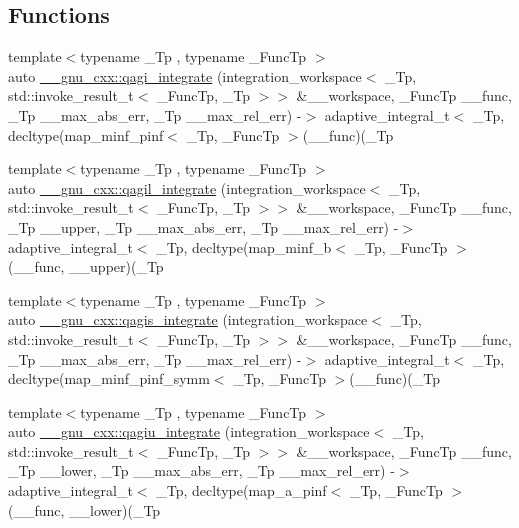\subsection*{Functions}
\begin{DoxyCompactItemize}
\item 
{\footnotesize template$<$typename \+\_\+\+Tp , typename \+\_\+\+Func\+Tp $>$ }\\auto \hyperlink{namespace____gnu__cxx_a0425e6f64911ad03088ec405d47f6817}{\+\_\+\+\_\+gnu\+\_\+cxx\+::qagi\+\_\+integrate} (integration\+\_\+workspace$<$ \+\_\+\+Tp, std\+::invoke\+\_\+result\+\_\+t$<$ \+\_\+\+Func\+Tp, \+\_\+\+Tp $>$$>$ \&\+\_\+\+\_\+workspace, \+\_\+\+Func\+Tp \+\_\+\+\_\+func, \+\_\+\+Tp \+\_\+\+\_\+max\+\_\+abs\+\_\+err, \+\_\+\+Tp \+\_\+\+\_\+max\+\_\+rel\+\_\+err) -\/$>$ adaptive\+\_\+integral\+\_\+t$<$ \+\_\+\+Tp, decltype(map\+\_\+minf\+\_\+pinf$<$ \+\_\+\+Tp, \+\_\+\+Func\+Tp $>$(\+\_\+\+\_\+func)(\+\_\+\+Tp
\item 
{\footnotesize template$<$typename \+\_\+\+Tp , typename \+\_\+\+Func\+Tp $>$ }\\auto \hyperlink{namespace____gnu__cxx_a1bc1539a9c0330930a7e37da72bc3d45}{\+\_\+\+\_\+gnu\+\_\+cxx\+::qagil\+\_\+integrate} (integration\+\_\+workspace$<$ \+\_\+\+Tp, std\+::invoke\+\_\+result\+\_\+t$<$ \+\_\+\+Func\+Tp, \+\_\+\+Tp $>$$>$ \&\+\_\+\+\_\+workspace, \+\_\+\+Func\+Tp \+\_\+\+\_\+func, \+\_\+\+Tp \+\_\+\+\_\+upper, \+\_\+\+Tp \+\_\+\+\_\+max\+\_\+abs\+\_\+err, \+\_\+\+Tp \+\_\+\+\_\+max\+\_\+rel\+\_\+err) -\/$>$ adaptive\+\_\+integral\+\_\+t$<$ \+\_\+\+Tp, decltype(map\+\_\+minf\+\_\+b$<$ \+\_\+\+Tp, \+\_\+\+Func\+Tp $>$(\+\_\+\+\_\+func, \+\_\+\+\_\+upper)(\+\_\+\+Tp
\item 
{\footnotesize template$<$typename \+\_\+\+Tp , typename \+\_\+\+Func\+Tp $>$ }\\auto \hyperlink{namespace____gnu__cxx_a7c2c57e5fc096155130cb44c4dacdd23}{\+\_\+\+\_\+gnu\+\_\+cxx\+::qagis\+\_\+integrate} (integration\+\_\+workspace$<$ \+\_\+\+Tp, std\+::invoke\+\_\+result\+\_\+t$<$ \+\_\+\+Func\+Tp, \+\_\+\+Tp $>$$>$ \&\+\_\+\+\_\+workspace, \+\_\+\+Func\+Tp \+\_\+\+\_\+func, \+\_\+\+Tp \+\_\+\+\_\+max\+\_\+abs\+\_\+err, \+\_\+\+Tp \+\_\+\+\_\+max\+\_\+rel\+\_\+err) -\/$>$ adaptive\+\_\+integral\+\_\+t$<$ \+\_\+\+Tp, decltype(map\+\_\+minf\+\_\+pinf\+\_\+symm$<$ \+\_\+\+Tp, \+\_\+\+Func\+Tp $>$(\+\_\+\+\_\+func)(\+\_\+\+Tp
\item 
{\footnotesize template$<$typename \+\_\+\+Tp , typename \+\_\+\+Func\+Tp $>$ }\\auto \hyperlink{namespace____gnu__cxx_acd07d4a9a1757bea02df44089a2a96bf}{\+\_\+\+\_\+gnu\+\_\+cxx\+::qagiu\+\_\+integrate} (integration\+\_\+workspace$<$ \+\_\+\+Tp, std\+::invoke\+\_\+result\+\_\+t$<$ \+\_\+\+Func\+Tp, \+\_\+\+Tp $>$$>$ \&\+\_\+\+\_\+workspace, \+\_\+\+Func\+Tp \+\_\+\+\_\+func, \+\_\+\+Tp \+\_\+\+\_\+lower, \+\_\+\+Tp \+\_\+\+\_\+max\+\_\+abs\+\_\+err, \+\_\+\+Tp \+\_\+\+\_\+max\+\_\+rel\+\_\+err) -\/$>$ adaptive\+\_\+integral\+\_\+t$<$ \+\_\+\+Tp, decltype(map\+\_\+a\+\_\+pinf$<$ \+\_\+\+Tp, \+\_\+\+Func\+Tp $>$(\+\_\+\+\_\+func, \+\_\+\+\_\+lower)(\+\_\+\+Tp

\end{DoxyCompactItemize}
